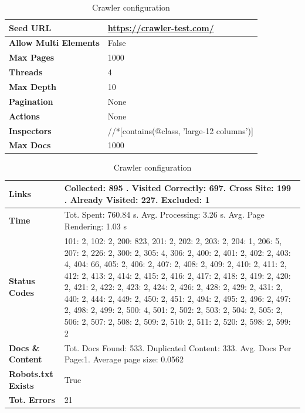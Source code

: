 {\begin{table}[ht] 
{\footnotesize
\begin{tabular}{ P{3cm} ||P{10.1cm}  }      %
 \hline \hline
\textbf{Seed URL} & \href{https://crawler-test.com/}{https://crawler-test.com/}\T\B 
\\ 
\hline
\textbf{Allow Multi Elements} & False \T\B 
\\ 
\hline
\textbf{Max Pages} & 1000\T\B 
\\ 
\hline
\textbf{Threads} & 4\T\B 
\\ 
\hline
\textbf{Max Depth} & 10\T\B 
\\ 
\hline
\textbf{Pagination} & None\T\B 
\\ 
\hline
\textbf{Actions} & None\T\B 
\\ 
\hline
\textbf{Inspectors} & //*[contains(@class, 'large-12 columns')]\T\B 
\\ 
\hline
\textbf{Max Docs} & 1000\T\B 
\\ 
\hline \hline
    \end{tabular}
}
  \captionsetup{justification=centering,margin=2cm}
  \caption{Crawler configuration}
\end{table}



\begin{table}[ht] 
{\footnotesize
\begin{tabular}{ P{3cm} ||P{10.1cm}  }      %
 \hline \hline
\textbf{Links} & Collected: 895 . Visited Correctly: 697. Cross Site: 199 . Already Visited: 227. Excluded: 1\T\B 
\\ 
\hline
\textbf{Time} & Tot. Spent: 760.84 s. Avg. Processing: 3.26 s. Avg. Page Rendering: 1.03 s\T\B 
\\
\hline
\textbf{Status Codes} &     101: 2, 102: 2, 200: 823, 201: 2, 202: 2, 203: 2, 204: 1, 206: 5, 207: 2, 226: 2, 300: 2, 305: 4, 306: 2, 400: 2, 401: 2, 402: 2, 403: 4, 404: 66, 405: 2, 406: 2, 407: 2, 408: 2, 409: 2, 410: 2, 411: 2, 412: 2, 413: 2, 414: 2, 415: 2, 416: 2, 417: 2, 418: 2, 419: 2, 420: 2, 421: 2, 422: 2, 423: 2, 424: 2, 426: 2, 428: 2, 429: 2, 431: 2, 440: 2, 444: 2, 449: 2, 450: 2, 451: 2, 494: 2, 495: 2, 496: 2, 497: 2, 498: 2, 499: 2, 500: 4, 501: 2, 502: 2, 503: 2, 504: 2, 505: 2, 506: 2, 507: 2, 508: 2, 509: 2, 510: 2, 511: 2, 520: 2, 598: 2, 599: 2\T\B 
\\ 
\hline
\textbf{Docs \& Content} & Tot. Docs Found: 533. Duplicated Content: 333. Avg. Docs Per Page:1. Average page size: 0.0562\T\B 
\\ 
\hline
\textbf{Robots.txt Exists} & True\T\B 
\\ 
\hline
\textbf{Tot. Errors} & 21\T\B 
\\ 
\hline \hline
    \end{tabular}
}
  \captionsetup{justification=centering,margin=2cm}
  \caption{Crawler configuration}
\end{table}


}
